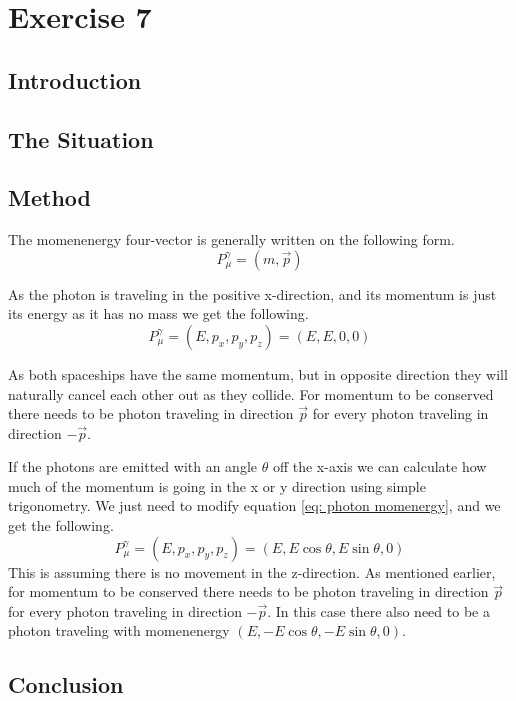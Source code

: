 \documentclass[reprint,english,notitlepage]{revtex4-2}
\begin{document}
\section{Exercise 7}

  \subsection{Introduction}

  \subsection{The Situation}

  \subsection{Method}
  The momenenergy four-vector is generally written on the following form.
  \[
  P_{μ}^{γ} = (m,\vec{p})
  \]
  
  As the photon is traveling in the positive x-direction, and its momentum is just its energy as it has no mass we get the following. 
  \begin{equation}\label{eq: photon momenergy}
    P_{μ}^{γ} =  (E, p_{x}, p_{y}, p_{z}) = (E, E, 0, 0)
  \end{equation}
  
  
  As both spaceships have the same momentum, but in opposite direction they will naturally cancel each other out as they collide. For momentum to be conserved there needs to be photon traveling in direction $ \vec{p} $ for every photon traveling in direction $ - \vec{p} $. 
  
  If the photons are emitted with an angle $ θ $ off the x-axis we can calculate how much of the momentum is going in the x or y direction using simple trigonometry. 
  We just need to modify equation \ref{eq: photon momenergy}, and we get the following.
  \begin{equation}\label{eq: angle photon momenergy}
    P_{μ}^{γ} =  (E, p_{x}, p_{y}, p_{z}) = (E, E \cos θ, E \sin θ, 0)
  \end{equation}
  This is assuming there is no movement in the z-direction. As mentioned earlier, for momentum to be conserved there needs to be photon traveling in direction $ \vec{p} $ for every photon traveling in direction $ - \vec{p} $. In this case there also need to be a photon traveling with momenenergy $  (E, -E\cos θ, -E \sin θ, 0)  $. 
  
  
  \subsection{Conclusion} 
\end{document}
